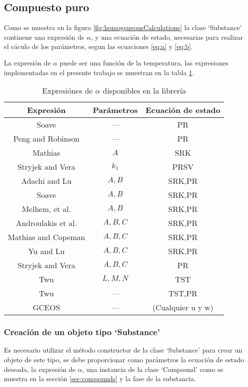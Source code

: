 \subsection{Compuesto puro}\label{subsec:substance}

Como se muestra en la figura \ref{fig:homogeneousCalculations} la clase `Substance' continene una expresión de $\alpha$, y una ecuación de estado, necesarias para realizar el cáculo de los parámetros, segun las ecuaciones \ref{eq:a} y \ref{eq:b}. 

La expresión de $\alpha$ puede ser una función de la temperatura, las expresiones implementadas en el presente trabajo se muestran en la tabla \ref{tab:alphas}.

\begin{table}[!h]
	\centering
	\caption{Expresiónes de $\alpha$ disponibles en la librería}\label{tab:alphas}
	\begin{tabular}{|c|c|c| }
		\hline
		Expresión & Parámetros & Ecuación de estado\\
		\hline
		Soave    &  ---& PR\\
		Peng and Robinson & ---& PR \\
		Mathias & $A$ & SRK\\
		Stryjek and Vera & $k_1$ & PRSV\\
		Adachi and Lu & $A,B$&SRK,PR\\
		Soave & $A,B$&SRK,PR\\
		Melhem, et al. & $A,B$&SRK,PR\\
		Androulakis et al. & $A,B,C$& SRK,PR\\
		Mathias and Copeman & $A,B,C$& SRK,PR\\
		Yu and Lu & $A,B,C$&SRK,PR\\
		Stryjek and Vera & $A,B,C$&PR\\
		Twu & $L,M,N$&TST\\
		Twu & ---&TST,PR\\
		GCEOS & ---& (Cualquier u y w)\\
		\hline
	\end{tabular}
\end{table}
\subsubsection{Creación de un objeto tipo `Substance'}\label{subsub:substanceCreation}

Es necesario utilizar el método constructor de la clase `Substance' para crear un objeto de este tipo, se debe proporcionar como parámetros la ecuación de estado deseada, la expresión de $\alpha$, una instancia de la clase `Compound' como se muestra en la sección \ref{sec:compounds} y la fase de la substancia.

